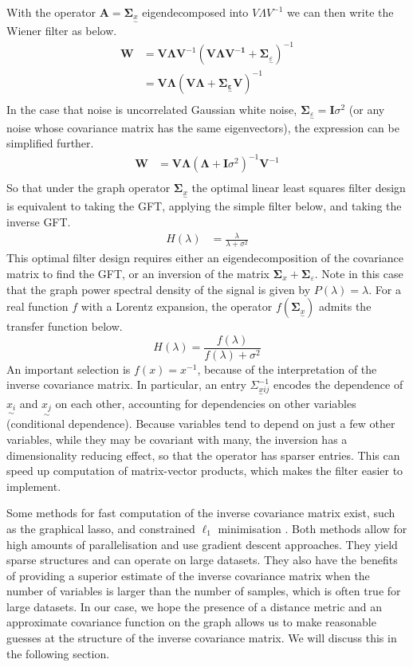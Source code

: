 \documentclass[12pt,a4paper]{article} %
\newcommand{\ve}[1]{\underset{\sim}{#1}}
\begin{document}
With the operator $\pmb{A}=\pmb{\Sigma}_{\ve{x}}$ eigendecomposed into $V\Lambda V^{-1}$ we can then write the Wiener filter as below.
\begin{align*}
    \pmb{W}&=\pmb{V\Lambda V}^{-1}(\pmb{V\Lambda V^{-1}}+\pmb{\Sigma}_{\ve{\varepsilon}})^{-1}\\
    &=\pmb{V\Lambda} (\pmb{V\Lambda} +\pmb{\Sigma_{\ve{\varepsilon}}V})^{-1}\\
\end{align*}
In the case that noise is uncorrelated Gaussian white noise, $\pmb{\Sigma}_{\ve{\varepsilon}}=\pmb{I}\sigma^2$ (or any noise whose covariance matrix has the same eigenvectors), the expression can be simplified further.
\begin{align*}
    \pmb{W}&=\pmb{V\Lambda} (\pmb{\Lambda} +\pmb{I}\sigma^2)^{-1}\pmb{V}^{-1}\\
\end{align*}
So that under the graph operator $\pmb{\Sigma}_{\ve{x}}$ the optimal linear least squares filter design is equivalent to taking the GFT, applying the simple filter below, and taking the inverse GFT.
\begin{align*}
    H(\lambda)&=\frac{\lambda}{\lambda+\sigma^2}
\end{align*}
This optimal filter design requires either an eigendecomposition of the covariance matrix to find the GFT, or an inversion of the matrix $\pmb{\Sigma}_x+\pmb{\Sigma}_\varepsilon$. Note in this case that the graph power spectral density of the signal is given by $P(\lambda)=\lambda$. For a real function $f$ with a Lorentz expansion, the operator $f(\pmb{\Sigma}_{\ve{x}})$ admits the transfer function below.
\[
    H(\lambda)=\frac{f(\lambda)}{f(\lambda)+\sigma^2}
\]
An important selection is $f(x)=x^{-1}$, because of the interpretation of the inverse covariance matrix. In particular, an entry $\Sigma_{\ve{x}ij}^{-1}$ encodes the dependence of $\ve{x_i}$ and $\ve{x_j}$ on each other, accounting for dependencies on other variables (conditional dependence). Because variables tend to depend on just a few other variables, while they may be covariant with many, the inversion has a dimensionality reducing effect, so that the operator has sparser entries. This can speed up computation of matrix-vector products, which makes the filter easier to implement.

Some methods for fast computation of the inverse covariance matrix exist, such as the graphical lasso, and constrained $\ell_1$ minimisation \cite{l1_min}\cite{glasso}. Both methods allow for high amounts of parallelisation and use gradient descent approaches. They yield sparse structures and can operate on large datasets. They also have the benefits of providing a superior estimate of the inverse covariance matrix when the number of variables is larger than the number of samples, which is often true for large datasets. In our case, we hope the presence of a distance metric and an approximate covariance function on the graph allows us to make reasonable guesses at the structure of the inverse covariance matrix. We will discuss this in the following section.
\end{document}
